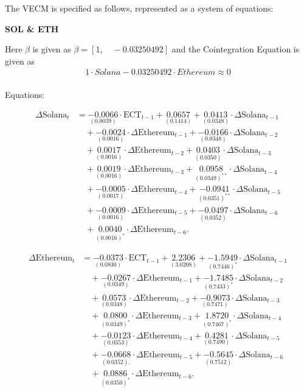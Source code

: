 \noindent The VECM is specified as follows, represented as a system of equations:\\

\begin{center}
    \textbf{SOL \& ETH}
\end{center}
Here $\beta$ is given as $ \beta =[1, \quad -0.03250492 ]$ and the Cointegration Equation is given as 
\begin{align*}
    1\cdot Solana - 0.03250492\cdot Ethereum \approx 0
\end{align*}
\\
Equations:

\begin{align*}
\Delta \text{Solana}_t &= 
\underset{(0.0039)}{-0.0066} \cdot \text{ECT}_{t-1} + 
\underset{(0.1414)}{0.0657} + 
\underset{(0.0348)}{0.0413} \cdot \Delta \text{Solana}_{t-1} \\
&\quad + \underset{(0.0016)}{-0.0024} \cdot \Delta \text{Ethereum}_{t-1} + 
\underset{(0.0348)}{-0.0166} \cdot \Delta \text{Solana}_{t-2} \\
&\quad + \underset{(0.0016)}{0.0017} \cdot \Delta \text{Ethereum}_{t-2} + 
\underset{(0.0350)}{0.0403} \cdot \Delta \text{Solana}_{t-3} \\
&\quad + \underset{(0.0016)}{0.0019} \cdot \Delta \text{Ethereum}_{t-3} + 
\underset{(0.0349)^{**}}{0.0958} \cdot \Delta \text{Solana}_{t-4} \\
&\quad + \underset{(0.0017)}{-0.0005} \cdot \Delta \text{Ethereum}_{t-4} + 
\underset{(0.0351)^{**}}{-0.0941} \cdot \Delta \text{Solana}_{t-5} \\
&\quad + \underset{(0.0016)}{-0.0009} \cdot \Delta \text{Ethereum}_{t-5} + 
\underset{(0.0352)}{-0.0497} \cdot \Delta \text{Solana}_{t-6} \\
&\quad + \underset{(0.0016)^*}{0.0040} \cdot \Delta \text{Ethereum}_{t-6}.
\end{align*}

\begin{align*}
\Delta \text{Ethereum}_t &= 
\underset{(0.0830)}{-0.0373} \cdot \text{ECT}_{t-1} + 
\underset{(3.0208)}{2.2306} + 
\underset{(0.7446)^*}{-1.5949} \cdot \Delta \text{Solana}_{t-1} \\
&\quad + \underset{(0.0349)}{-0.0267} \cdot \Delta \text{Ethereum}_{t-1} + 
\underset{(0.7433)^*}{-1.7485} \cdot \Delta \text{Solana}_{t-2} \\
&\quad + \underset{(0.0348)}{0.0573} \cdot \Delta \text{Ethereum}_{t-2} + 
\underset{(0.7471)}{-0.9073} \cdot \Delta \text{Solana}_{t-3} \\
&\quad + \underset{(0.0349)^*}{0.0800} \cdot \Delta \text{Ethereum}_{t-3} + 
\underset{(0.7467)^*}{1.8720} \cdot \Delta \text{Solana}_{t-4} \\
&\quad + \underset{(0.0353)}{-0.0123} \cdot \Delta \text{Ethereum}_{t-4} + 
\underset{(0.7490)}{0.4281} \cdot \Delta \text{Solana}_{t-5} \\
&\quad + \underset{(0.0352).}{-0.0668} \cdot \Delta \text{Ethereum}_{t-5} + 
\underset{(0.7512)}{-0.5645} \cdot \Delta \text{Solana}_{t-6} \\
&\quad + \underset{(0.0350)^*}{0.0886} \cdot \Delta \text{Ethereum}_{t-6}.
\end{align*}

